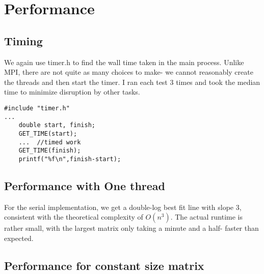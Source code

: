 \documentclass{article}
\begin{document}
\section{Performance}
\subsection{Timing}
We again use timer.h to find the wall time taken in the main process. Unlike MPI, there are not quite as many choices to make- we cannot reasonably create the threads and then start the timer. I ran each test 3 times and took the median time to minimize disruption by other tasks.
\begin{lstlisting}[style=CStyle]
#include "timer.h"
...
    double start, finish;
    GET_TIME(start);
    ...  //timed work
    GET_TIME(finish);    
    printf("%f\n",finish-start);
    \end{lstlisting}
\subsection{Performance with One thread}

For the serial implementation, we get a double-log best fit line with slope 3, consistent with the theoretical complexity of $O(n^3)$. The actual runtime is rather small, with the largest matrix only taking a minute and a half- faster than expected.
\subsection{Performance for constant size matrix}
\end{document}
